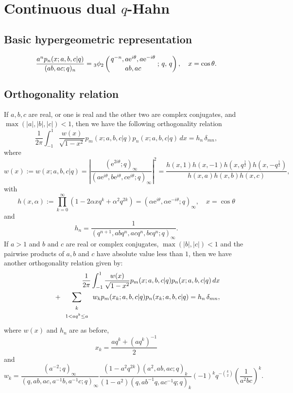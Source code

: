\documentclass[envcountchap,graybox]{svmono}
\newcommand{\qhyp}[5]{\mbox{}_{#1}{\phi}_{#2}
\left(\genfrac{}{}{0pt}{}{#3}{#4}\,;\,q,\,#5\right)}
\newcommand{\mathindent}{\hspace{7.5mm}}
\newcommand{\e}{\textrm{e}}
\begin{document}
\section{Continuous dual $q$-Hahn}
\par\setcounter{equation}{0}

\subsection*{Basic hypergeometric representation}
\begin{equation}
\label{DefContDualqHahn}
\frac{a^np_n(x;a,b,c|q)}{(ab,ac;q)_n}
=\qhyp{3}{2}{q^{-n},a\e^{i\theta},a\e^{-i\theta}}{ab,ac}{q},\quad x=\cos\theta.
\end{equation}

\subsection*{Orthogonality relation}
If $a,b,c$ are real, or one is real and the other two are complex conjugates, and
$\max(|a|,|b|,|c|)<1$, then we have the following orthogonality relation
\begin{equation}
\label{OrtContDualqHahnI}
\frac{1}{2\pi}\int_{-1}^1\frac{w(x)}{\sqrt{1-x^2}}p_m(x;a,b,c|q)p_n(x;a,b,c|q)\,dx
=h_n\,\delta_{mn},
\end{equation}
where
$$w(x):=w(x;a,b,c|q)=\left|\frac{(\e^{2i\theta};q)_{\infty}}
{(a\e^{i\theta},b\e^{i\theta},c\e^{i\theta};q)_{\infty}}\right|^2=
\frac{h(x,1)h(x,-1)h(x,q^{\frac{1}{2}})h(x,-q^{\frac{1}{2}})}{h(x,a)h(x,b)h(x,c)},$$
with
$$h(x,\alpha):=\prod_{k=0}^{\infty}\left(1-2\alpha xq^k+\alpha^2q^{2k}\right)
=\left(\alpha\e^{i\theta},\alpha\e^{-i\theta};q\right)_{\infty},\quad x=\cos\theta$$
and
$$h_n=\frac{1}{(q^{n+1},abq^n,acq^n,bcq^n;q)_{\infty}}.$$
If $a>1$ and $b$ and $c$ are real or complex conjugates,
$\max(|b|,|c|)<1$ and the pairwise products of $a,b$ and $c$ have
absolute value less than $1$, then we have another orthogonality relation
given by:
\begin{eqnarray}
\label{OrtContDualqHahnII}
& &\frac{1}{2\pi}\int_{-1}^1\frac{w(x)}{\sqrt{1-x^2}}p_m(x;a,b,c|q)p_n(x;a,b,c|q)\,dx\nonumber\\
& &{}\mathindent{}+\sum_{\begin{array}{c}\scriptstyle k\\ \scriptstyle 1<aq^k\leq a\end{array}}
w_kp_m(x_k;a,b,c|q)p_n(x_k;a,b,c|q)=h_n\,\delta_{mn},
\end{eqnarray}
where $w(x)$ and $h_n$ are as before,
$$x_k=\frac{aq^k+\left(aq^k\right)^{-1}}{2}$$
and
$$w_k=\frac{(a^{-2};q)_{\infty}}{(q,ab,ac,a^{-1}b,a^{-1}c;q)_{\infty}}
\frac{(1-a^2q^{2k})(a^2,ab,ac;q)_k}{(1-a^2)(q,ab^{-1}q,ac^{-1}q;q)_k}
(-1)^kq^{-\binom{k}{2}}\left(\frac{1}{a^2bc}\right)^k.$$
\end{document}
